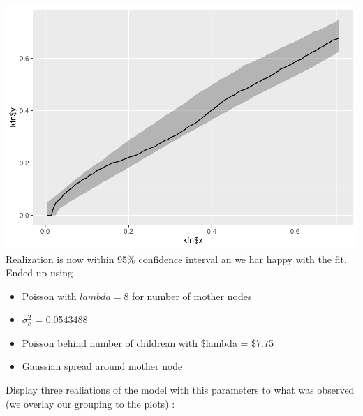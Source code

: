 \documentclass[
]{article}
\begin{document}
\includegraphics{project2_files/figure-latex/unnamed-chunk-16-1.pdf}
Realization is now within 95\% confidence interval an we har happy with
the fit. Ended up using

\begin{itemize}
\item
  Poisson with \(lambda = 8\) for number of mother nodes
\item
  \(\sigma^2_c\) = 0.0543488
\item
  Poisson behind number of childrean with \$lambda = \$7.75
\item
  Gaussian spread around mother node
\end{itemize}

Display three realiations of the model with this parameters to what was
observed (we overlay our grouping to the plots) :
\end{document}
